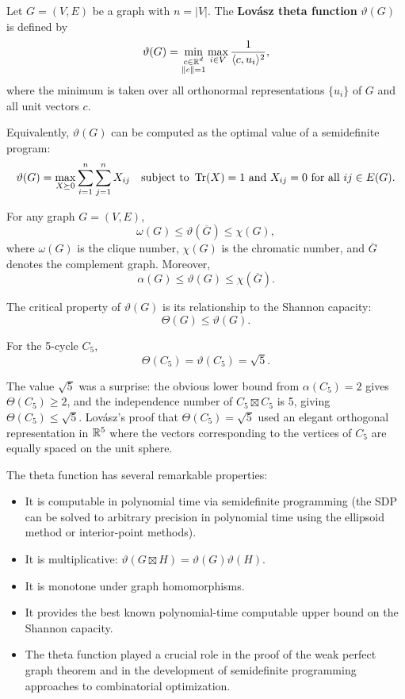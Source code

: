 \begin{definition}
Let \(G = (V,E)\) be a graph with \(n = |V|\). The \textbf{Lov\'{a}sz theta function} \(\vartheta(G)\) is defined by
\[
\vartheta(G) = \min_{\substack{c \in \mathbb{R}^d \\ \|c\| = 1}} \max_{i \in V} \frac{1}{\langle c, u_i \rangle^2},
\]
where the minimum is taken over all orthonormal representations \(\{u_i\}\) of \(G\) and all unit vectors \(c\).
\end{definition}

Equivalently, \(\vartheta(G)\) can be computed as the optimal value of a semidefinite program:
\[
\vartheta(G) = \max_{X \succeq 0} \sum_{i=1}^n \sum_{j=1}^n X_{ij} \quad \text{subject to } \Tr(X) = 1 \text{ and } X_{ij} = 0 \text{ for all } ij \in E(G).
\]

\begin{theorem}
For any graph \(G = (V,E)\),
\[
\omega(G) \leq \vartheta(\overline{G}) \leq \chi(G),
\]
where \(\omega(G)\) is the clique number, \(\chi(G)\) is the chromatic number, and \(\overline{G}\) denotes the complement graph. Moreover,
\[
\alpha(G) \leq \vartheta(G) \leq \chi(\overline{G}).
\]
\end{theorem}

The critical property of \(\vartheta(G)\) is its relationship to the Shannon capacity:
\[
\Theta(G) \leq \vartheta(G).
\]

\begin{theorem}[Lov\'{a}sz, 1979]
For the 5-cycle \(C_5\),
\[
\Theta(C_5) = \vartheta(C_5) = \sqrt{5}.
\]
\end{theorem}
The value \(\sqrt{5}\) was a surprise: the obvious lower bound from \(\alpha(C_5) = 2\) gives \(\Theta(C_5) \geq 2\), and the independence number of \(C_5 \boxtimes C_5\) is 5, giving \(\Theta(C_5) \leq \sqrt{5}\). Lov\'{a}sz's proof that \(\Theta(C_5) = \sqrt{5}\) used an elegant orthogonal representation in \(\mathbb{R}^5\) where the vectors corresponding to the vertices of \(C_5\) are equally spaced on the unit sphere.

The theta function has several remarkable properties:
\begin{itemize}
  \item It is computable in polynomial time via semidefinite programming (the SDP can be solved to arbitrary precision in polynomial time using the ellipsoid method or interior-point methods).
  \item It is multiplicative: \(\vartheta(G \boxtimes H) = \vartheta(G) \vartheta(H)\).
  \item It is monotone under graph homomorphisms.
  \item It provides the best known polynomial-time computable upper bound on the Shannon capacity.
  \item The theta function played a crucial role in the proof of the weak perfect graph theorem and in the development of semidefinite programming approaches to combinatorial optimization.
\end{itemize}

